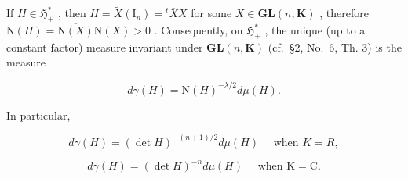 If \(H \in \mathfrak{H}_+^*\) , then \(H = \widetilde{X}(\mathrm{I}_n) = {}^t\overline{X}X\) for some \(X \in \mathbf{GL}(n,\mathbf{K})\) , therefore \(\mathrm{N}(H) = \overline{\mathrm{N}(X)}\mathrm{N}(X) > 0\) . Consequently, on \(\mathfrak{H}_+^*\) , the unique (up to a constant factor) measure invariant under \(\mathbf{GL}(n,\mathbf{K})\) (cf.~§2, No.~6, Th. 3) is the measure

\[
d \gamma (H) = \mathrm{N} (H) ^ {- \lambda / 2} d \mu (H).
\]

In particular,

\[
d \gamma (H) = (\det H) ^ {- (n + 1) / 2} d \mu (H) \quad \text { when } K = R,
\]

\[
d \gamma (H) = (\det H) ^ {- n} d \mu (H) \quad \text { when } \mathrm{K} = \mathrm{C}.
\]

